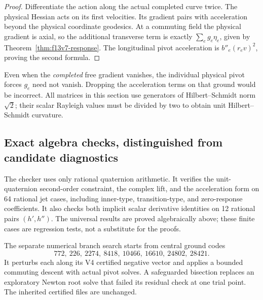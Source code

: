 \documentclass[11pt,oneside]{article}
\begin{document}
\begin{proof}
Differentiate the action along the actual
completed curve twice. The physical Hessian
acts on its first velocities. Its gradient
pairs with acceleration beyond the physical
coordinate geodesics. At a commuting field
the physical gradient is axial, so the
additional transverse term is exactly
\(\sum_e g_e\eta_e\), given by
Theorem~\ref{thm:f13v7-response}. The longitudinal
pivot acceleration is
\(b''_e(r_ev)^2\), proving the second formula.
\end{proof}

Even when the \emph{completed} free gradient
vanishes, the individual physical pivot forces
\(g_e\) need not vanish. Dropping the acceleration
terms on that ground would be incorrect.
All matrices in this section use generators
of Hilbert--Schmidt norm \(\sqrt2\); their
scalar Rayleigh values must be divided by two
to obtain unit Hilbert--Schmidt curvature.

\subsection{Exact algebra checks, distinguished from candidate diagnostics}

The checker
uses only rational quaternion arithmetic.
It verifies the unit-quaternion second-order
constraint, the complex lift, and the
acceleration form on 64 rational jet cases,
including inner-type, transition-type, and
zero-response coefficients. It also checks
both implicit scalar derivative identities
on 12 rational pairs \((h',h'')\).
The universal results are proved algebraically
above; these finite cases are regression tests,
not a substitute for the proofs.

The separate numerical branch search starts
from central ground codes
\[
 772,\ 226,\ 2274,\ 8418,\ 10466,\ 16610,\ 24802,\ 28421 .
\]
It perturbs each along its V4 certified
negative vector and applies a bounded
commuting descent with actual pivot solves.
A safeguarded bisection replaces an
exploratory Newton root solve that failed
its residual check at one trial point.
The inherited certified files are unchanged.
\end{document}
